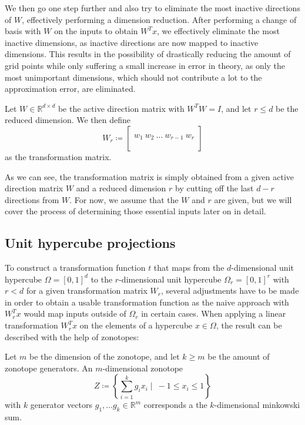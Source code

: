 \documentclass[
  a4paper,  %
  twoside,  %
  bibliography=totoc,
  headsepline,
  cleardoublepage=empty,
  parskip=half,
  draft=false
]{scrbook}
\begin{document}
We then go one step further and also try to eliminate the most inactive directions of $W$, effectively performing a dimension reduction.
After performing a change of basis with $W$ on the inputs to obtain $W^T x$, we effectively eliminate the most inactive dimensions, as inactive directions are now mapped to inactive dimensions.
This results in the possibility of drastically reducing the amount of grid points while only suffering a small increase in error in theory, as only the most unimportant dimensions, which should not contribute a lot to the approximation error, are eliminated.

\begin{definition}
Let $W \in \mathds{R}^{d \times d}$ be the active direction matrix with $W^T W=I$, and let $r \leq d$ be the reduced dimension.
We then define
\begin{equation}
W_r \coloneqq \begin{bmatrix}
  \\
    w_1 ~ w_2 ~ \dots ~ w_{r-1} ~ w_r\\
    \\
  \end{bmatrix}
\end{equation}
as the transformation matrix.
\end{definition}

As we can see, the transformation matrix is simply obtained from a given active direction matrix $W$ and a reduced dimension $r$ by cutting off the last $d - r$ directions from $W$.
For now, we assume that the $W$ and $r$ are given, but we will cover the process of determining those essential inputs later on in detail.

\subsection{Unit hypercube projections}

To construct a transformation function $t$ that maps from the $d$-dimensional unit hypercube $\Omega=[0,1]^d$ to the $r$-dimensional unit hypercube $\Omega_r=[0,1]^r$ with $r < d$ for a given transformation matrix $W_r$, several adjustments have to be made in order to obtain a usable transformation function as the naive approach with $W_r^T x$ would map inputs outside of $\Omega_r$ in certain cases.
When applying a linear transformation $W_r^T x$ on the elements of a hypercube $x \in \Omega$, the result can be described with the help of zonotopes:

\begin{definition}[Zonotope]
Let $m$ be the dimension of the zonotope, and let $k \geq  m$ be the amount of zonotope generators.
An $m$-dimensional zonotope
\begin{equation}
Z \coloneqq \left\{\sum_{i=1}^k g_i x_i \mid ~ -1 \leq x_i \leq 1\right\}
  \label{zonotope}
\end{equation}
with $k$ generator vectors $g_1, \dots g_k \in \mathds{R}^m$ corresponds a the $k$-dimensional minkowski sum.
\end{definition}
\end{document}
